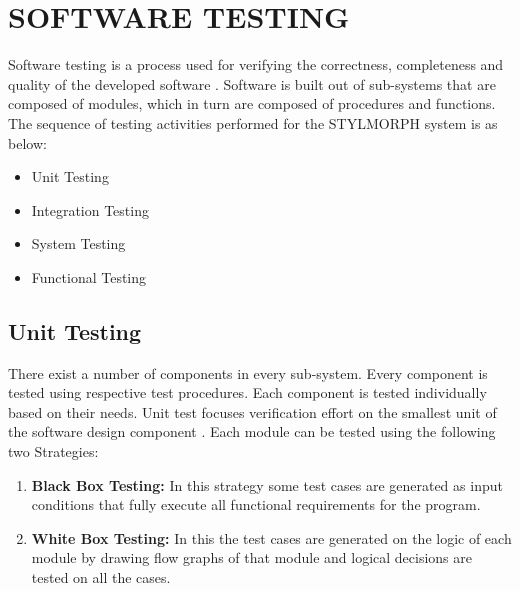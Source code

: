 \documentclass[12pt,a4paper,oneside]{report}
\begin{document}
\chapter{SOFTWARE TESTING}

Software testing is a process used for verifying the correctness, completeness and quality of the developed software \cite{19}. Software is built out of sub-systems that are composed of modules, which in turn are composed of procedures and functions. The sequence of testing activities performed for the STYLMORPH system is as below:

\begin{itemize}
    \item Unit Testing
    \item Integration Testing
    \item System Testing
    \item Functional Testing
\end{itemize}

\section{Unit Testing}

There exist a number of components in every sub-system. Every component is tested using respective test procedures. Each component is tested individually based on their needs. Unit test focuses verification effort on the smallest unit of the software design component \cite{19}. Each module can be tested using the following two Strategies:

\begin{enumerate}
    \item \textbf{Black Box Testing:} In this strategy some test cases are generated as input conditions that fully execute all functional requirements for the program.
    \item \textbf{White Box Testing:} In this the test cases are generated on the logic of each module by drawing flow graphs of that module and logical decisions are tested on all the cases.
\end{enumerate}
\end{document}
